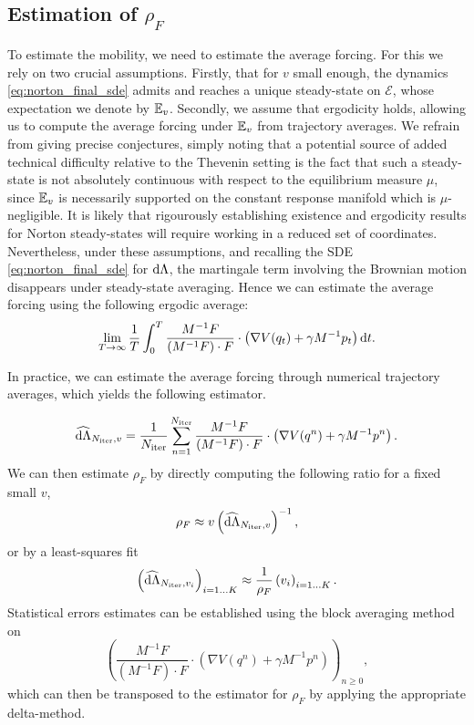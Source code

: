 \subsection{Estimation of $\rho_F$}
To estimate the mobility, we need to estimate the average forcing. For this we rely on two crucial assumptions. Firstly, that for $v$ small enough, the dynamics \eqref{eq:norton_final_sde} admits and reaches a unique steady-state on $\mathcal E$, whose expectation we denote by $\mathbb{E}_v$.
Secondly, we assume that ergodicity holds, allowing us to compute the average forcing under $\mathbb{E}_v$ from trajectory averages. We refrain from giving precise conjectures, simply noting that a potential source of added technical difficulty relative to the Thevenin setting is the fact that such a steady-state is not absolutely continuous with respect to the equilibrium measure $\mu$, since $\mathbb{E}_v$ is necessarily supported on the constant response manifold which is $\mu$-negligible.
It is likely that rigourously establishing existence and ergodicity results for Norton steady-states will require working in a reduced set of coordinates.
Nevertheless, under these assumptions, and recalling the SDE \eqref{eq:norton_final_sde} for $\mathrm{d} \Lambda$, the martingale term involving the Brownian motion disappears under steady-state averaging.
Hence we can estimate the average forcing using the following ergodic average:
\begin{equation}
    \label{eq:norton_ergodic_forcing}
    \underset{T\to\infty}\lim\,\frac{1}T\int_0^T\frac{M^{-1}F}{\left(M^{-1}F\right)\cdot F}\cdot\left(\nabla V(q_t)+\gamma M^{-1}p_t\right)\mathrm{d} t.
\end{equation}

In practice, we can estimate the average forcing through numerical trajectory averages, which yields the following estimator.

\begin{equation}
    \widehat{\mathrm{d} \Lambda}_{N_{\mathrm{iter}},v}=\frac{1}{N_{\mathrm{iter}}}\sum_{n=1}^{N_{\mathrm{iter}}}\frac{M^{-1}F}{\left(M^{-1}F\right)\cdot F}\cdot\left(\nabla V(q^n)+\gamma M^{-1}p^n\right).
\end{equation}
We can then estimate $\rho_F$ by directly computing the following ratio for a fixed small $v$,
\begin{equation}
    \label{eq:norton_rho_F_estimator}
    \rho_F \approx v\left(\widehat{\mathrm{d} \Lambda}_{N_{\mathrm{iter}},v}\right)^{-1},
\end{equation}
or by a least-squares fit 
\[\left(\widehat{\mathrm{d} \Lambda}_{N_{\mathrm{iter}},v_i}\right)_{i=1\dots K}\approx\frac{1}{\rho_F}\left(v_i\right)_{i=1\dots K}.\]
Statistical errors estimates can be established using the block averaging method on
\[\left(\frac{M^{-1}F}{\left(M^{-1}F\right)\cdot F}\cdot\left(\nabla V(q^n)+\gamma M^{-1}p^n\right)\right)_{n\geq 0},\]
which can then be transposed to the estimator for $\rho_F$ by applying the appropriate delta-method. 

